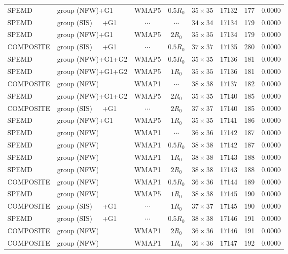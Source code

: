 \documentclass[useAMS,usenatbib]{mnras}
\def\nomicro{$\cdots$}
\def\nodata{$\cdots$}
\begin{document}
\begin{table}
\begin{tabular}{llccccrr}
        SPEMD     & group (NFW)+G1    &WMAP5 & $0.5R_{0}$&$35\times35$ & 17132 & 177 & 0.0000\\
        SPEMD     & group (SIS)~~~+G1 &\nodata& \nomicro&$34\times34$ & 17134 & 179 & 0.0000\\
        SPEMD     & group (NFW)+G1    &WMAP5 & $2R_{0}$&$35\times35$ & 17134 & 179 & 0.0000\\
        COMPOSITE & group (SIS)~~~+G1 &\nodata& $0.5R_{0}$&$37\times37$ & 17135 & 280 & 0.0000\\
        SPEMD     & group (NFW)+G1+G2 &WMAP5 & $0.5R_{0}$&$35\times35$ & 17136 & 181 & 0.0000\\
        SPEMD     & group (NFW)+G1+G2 &WMAP5 & $1R_{0}$&$35\times35$ & 17136 & 181 & 0.0000\\
        COMPOSITE & group (NFW)       &WMAP1 & \nomicro&$38\times38$ & 17137 & 182 & 0.0000\\
        SPEMD     & group (NFW)+G1+G2 &WMAP5 & $2R_{0}$&$35\times35$ & 17140 & 185 & 0.0000\\
        COMPOSITE & group (SIS)~~~+G1 &\nodata& $2R_{0}$&$37\times37$ & 17140 & 185 & 0.0000\\
        SPEMD     & group (NFW)+G1    &WMAP5 & $1R_{0}$&$35\times35$ & 17141 & 186 & 0.0000\\
        SPEMD     & group (NFW)       &WMAP1 & \nomicro&$36\times36$ & 17142 & 187 & 0.0000\\
        SPEMD     & group (NFW)       &WMAP1 & $0.5R_{0}$&$38\times38$ & 17142 & 187 & 0.0000\\
        SPEMD     & group (NFW)       &WMAP1 & $1R_{0}$&$38\times38$ & 17143 & 188 & 0.0000\\
        SPEMD     & group (NFW)       &WMAP1 & $2R_{0}$&$38\times38$ & 17143 & 188 & 0.0000\\
        COMPOSITE & group (NFW)       &WMAP1 & $0.5R_{0}$&$36\times36$ & 17144 & 189 & 0.0000\\
        SPEMD     & group (NFW)       &WMAP5 & $1R_{0}$&$38\times38$ & 17145 & 190 & 0.0000\\
        COMPOSITE & group (SIS)~~~+G1 &\nodata& $1R_{0}$&$37\times37$ & 17145 & 190 & 0.0000\\
        SPEMD     & group (SIS)~~~+G1 &\nodata& $0.5R_{0}$&$38\times38$ & 17146 & 191 & 0.0000\\
        COMPOSITE & group (NFW)       &WMAP1 & $2R_{0}$&$36\times36$ & 17146 & 191 & 0.0000\\
        COMPOSITE & group (NFW)       &WMAP1 & $1R_{0}$&$36\times36$ & 17147 & 192 & 0.0000\\

\end{tabular}
\end{table}
\end{document}
